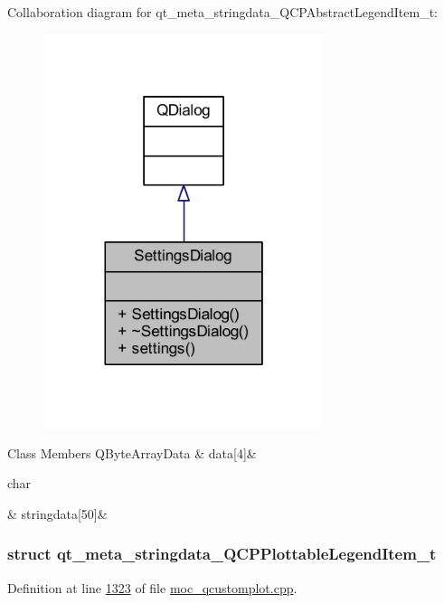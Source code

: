 Collaboration diagram for qt\+\_\+meta\+\_\+stringdata\+\_\+\+Q\+C\+P\+Abstract\+Legend\+Item\+\_\+t\+:
\nopagebreak
\begin{figure}[H]
\begin{center}
\leavevmode
\includegraphics[width=233pt]{d3/d07/a00305}
\end{center}
\end{figure}
\begin{DoxyFields}{Class Members}
\hypertarget{a00067_a98fcd80c37c93a0b0b71f18405466d42}{Q\+Byte\+Array\+Data}\label{a00067_a98fcd80c37c93a0b0b71f18405466d42}
&
data\mbox{[}4\mbox{]}&
\\
\hline

\hypertarget{a00067_a007f69edf60f3475c27481b80fb00e7f}{char}\label{a00067_a007f69edf60f3475c27481b80fb00e7f}
&
stringdata\mbox{[}50\mbox{]}&
\\
\hline

\end{DoxyFields}
\label{d3/de5/a00209}
\hypertarget{a00067_d3/de5/a00209}{}
\subsubsection{struct qt\+\_\+meta\+\_\+stringdata\+\_\+\+Q\+C\+P\+Plottable\+Legend\+Item\+\_\+t}


Definition at line \hyperlink{a00067_source_l01323}{1323} of file \hyperlink{a00067_source}{moc\+\_\+qcustomplot.\+cpp}.



